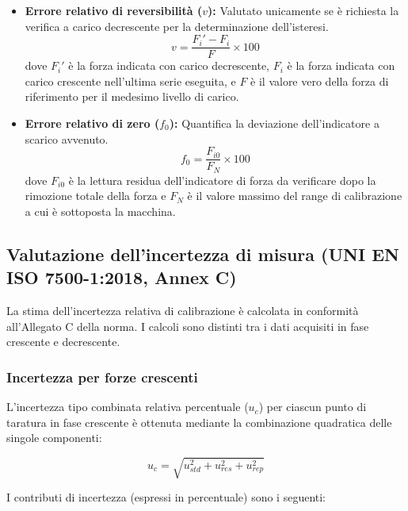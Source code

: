 \documentclass[a4paper, twoside]{article}
\begin{document}
\begin{itemize}
    \item \textbf{Errore relativo di reversibilità ($v$):} Valutato unicamente se è richiesta la verifica a carico decrescente per la determinazione dell'isteresi.
    \begin{equation}
        v = \frac{F_i' - F_i}{F} \times 100
    \end{equation}
    dove $F_i'$ è la forza indicata con carico decrescente, $F_i$ è la forza indicata con carico crescente nell'ultima serie eseguita, e $F$ è il valore vero della forza di riferimento per il medesimo livello di carico.

    \item \textbf{Errore relativo di zero ($f_0$):} Quantifica la deviazione dell'indicatore a scarico avvenuto.
    \begin{equation}
        f_0 = \frac{F_{i0}}{F_N} \times 100
    \end{equation}
    dove $F_{i0}$ è la lettura residua dell'indicatore di forza da verificare dopo la rimozione totale della forza e $F_N$ è il valore massimo del range di calibrazione a cui è sottoposta la macchina.
\end{itemize}


\subsection{Valutazione dell'incertezza di misura (UNI EN ISO 7500-1:2018, Annex C)}

La stima dell'incertezza relativa di calibrazione è calcolata in conformità all'Allegato C della norma. I calcoli sono distinti tra i dati acquisiti in fase crescente e decrescente.

\subsubsection{Incertezza per forze crescenti}
L'incertezza tipo combinata relativa percentuale ($u_c$) per ciascun punto di taratura in fase crescente è ottenuta mediante la combinazione quadratica delle singole componenti:

\begin{equation}
    u_c = \sqrt{u_{std}^2 + u_{res}^2 + u_{rep}^2}
\end{equation}

I contributi di incertezza (espressi in percentuale) sono i seguenti:
\end{document}

